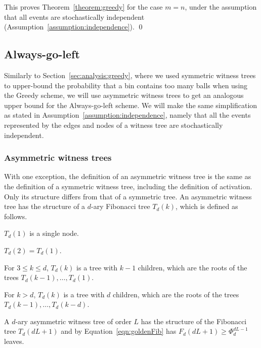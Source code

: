 \documentclass[a4paper,12pt]{article}
\newcommand\todo[1]{\textcolor{red}{(TODO: #1)}}
\begin{document}
This proves Theorem~\ref{theorem:greedy} for the case $m=n$, under the assumption that all events are stochastically independent (Assumption~\ref{assumption:independence}). \qed

\subsection{Always-go-left}
\label{sec:analysis:alg}
Similarly to Section~\ref{sec:analysis:greedy}, where we used symmetric witness trees to upper-bound the probability that a bin contains too many balls when using the Greedy scheme, we will use asymmetric witness trees to get an analogous upper bound for the Always-go-left scheme. We will make the same simplification as stated in Assumption~\ref{assumption:independence}, namely that all the events represented by the edges and nodes of a witness tree are stochastically independent.

\subsubsection{Asymmetric witness trees}
\label{sec:analysis:definitionAsymWT}
With one exception, the definition of an asymmetric witness tree is the same as the definition of a symmetric witness tree, including the definition of activation. Only its structure differs from that of a symmetric tree. An asymmetric witness tree has the structure of a $d$-ary Fibonacci tree $T_d\left(k \right)$, which is defined as follows.
\begin{compactitem}
\item $T_d(1)$ is a single node.
\item $T_d(2) = T_d(1)$.
\item For $3\leq k \leq d$, $T_d(k)$ is a tree with $k-1$ children, which are the roots of the trees $T_d(k-1),\ldots,T_d(1)$.
\item For $k>d$, $T_d(k)$ is a tree with $d$ children, which are the roots of the trees $T_d(k-1),\ldots,T_d(k-d)$.
\end{compactitem}

A $d$-ary asymmetric witness tree of order $L$ has the structure of the Fibonacci tree $T_d(d  L+1)$ and by Equation~\ref{eqn:goldenFib} has $F_d(d L + 1) \geq \Phi_d^{d L-1}$ leaves. 
\end{document}
